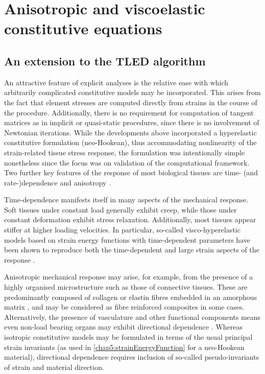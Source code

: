 \section{Anisotropic and viscoelastic constitutive equations}

	\subsection{An extension to the TLED algorithm}	
An attractive feature of explicit analyses is the relative ease with which arbitrarily complicated constitutive models may be incorporated. This arises from the fact that element stresses are computed directly from strains in the course of the procedure. Additionally, there is no requirement for computation of tangent matrices as in implicit or quasi-static procedures, since there is no involvement of Newtonian iterations. While the developments above incorporated a hyperelastic constitutive formulation (neo-Hookean), thus accommodating nonlinearity of the strain-related tissue stress response, the formulation was intentionally simple nonetheless since the focus was on validation of the computational framework. Two further key features of the response of most biological tissues are time- (and rate-)dependence and anisotropy \citep{Fung93}. 

Time-dependence manifests itself in many aspects of the mechanical response. Soft tissues under constant load generally exhibit creep, while those under constant deformation exhibit stress relaxation. Additionally, most tissues appear stiffer at higher loading velocities. In particular, so-called visco-hyperelastic models based on strain energy functions with time-dependent parameters have been shown to reproduce both the time-dependent and large strain aspects of the response \citep{Miller97,Miller00,Nava08}. 

Anisotropic mechanical response may arise, for example, from the presence of a highly organised microstructure such as those of connective tissues. These are predominantly composed of collagen or elastin fibres embedded in an amorphous matrix \citep{Fung93}, and may be considered as fibre reinforced composites in some cases. Alternatively, the presence of vasculature and other functional components means even non-load bearing organs may exhibit directional dependence \citep{Picinbono01,Prange02}. Whereas isotropic constitutive models may be formulated in terms of the usual principal strain invariants (as used in \eqref{chap5:strainEnergyFunction} for a neo-Hookean material), directional dependence requires inclusion of so-called pseudo-invariants of strain and material direction. 

